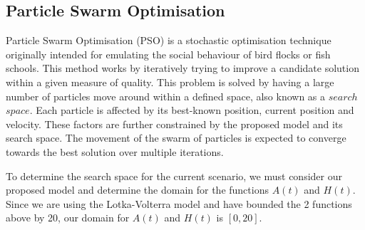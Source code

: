 \documentclass{article}
\newcommand*\circled[1]{\tikz[baseline=(char.base)]{
            \node[shape=circle,draw,inner sep=2pt] (char) {#1};}}
\begin{document}
\subsection*{\circled{3.2} Particle Swarm Optimisation}
{\par \noindent
Particle Swarm Optimisation (PSO) is a stochastic optimisation technique originally intended for emulating the social behaviour of bird flocks or fish schools. This method works by iteratively trying to improve a candidate solution within a given measure of quality. This problem is solved by having a large number of particles move around within a defined space, also known as a $search$ $space$. Each particle is affected by its best-known position, current position and velocity. These factors are further constrained by the proposed model and its search space. The movement of the swarm of particles is expected to converge towards the best solution over multiple iterations.
}
\newline
{\par \noindent
To determine the search space for the current scenario, we must consider our proposed model and determine the domain for the functions $A(t)$ and $H(t)$. Since we are using the Lotka-Volterra model and have bounded the 2 functions above by 20, our domain for $A(t)$ and $H(t)$ is $[0,20]$.
}
\end{document}
